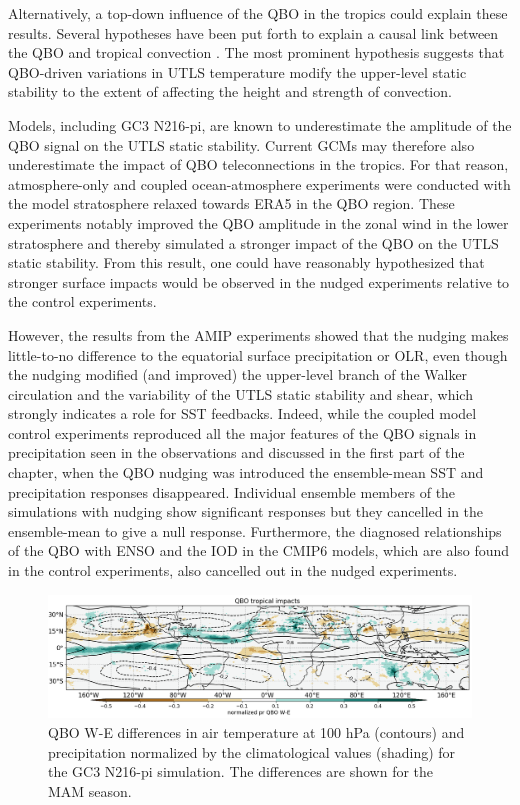 Alternatively, a top-down influence of the QBO in the tropics could explain these results. Several hypotheses have been put forth to explain a causal link between the QBO and tropical convection  \citep{hitchman2021observational,haynes2021influence}. The most prominent hypothesis suggests that QBO-driven variations in UTLS temperature modify the upper-level static stability to the extent of affecting the height and strength of convection.  


Models, including GC3 N216-pi, are known to underestimate the amplitude of the QBO signal on the UTLS static stability. Current GCMs may therefore 
also underestimate the impact of QBO teleconnections in the tropics. 
For that reason, atmosphere-only and coupled ocean-atmosphere experiments were 
conducted with the model stratosphere relaxed towards ERA5 in the QBO region. These 
experiments notably improved the QBO amplitude in the zonal wind in the lower stratosphere and thereby simulated a stronger impact of the QBO on the UTLS static stability. From this result, one could have reasonably hypothesized that stronger surface impacts would be observed in the nudged experiments relative to the control experiments. 

However, the results from the AMIP experiments showed that the nudging makes little-to-no difference to the equatorial surface precipitation or OLR, even though the nudging modified (and improved) the upper-level branch of the Walker circulation and the variability of the UTLS static stability and shear, which strongly indicates a role for SST feedbacks. Indeed, while the coupled model control experiments reproduced all the major features of the QBO signals in precipitation seen in the observations and discussed in the first part of the chapter, when the QBO nudging was introduced the ensemble-mean SST and precipitation responses disappeared. Individual ensemble members of the simulations with nudging show significant responses but they cancelled in the ensemble-mean to give a null response. Furthermore, the diagnosed relationships of the QBO with ENSO and the IOD in the CMIP6 models, which are also found in the control experiments, also cancelled out in the nudged experiments.  


\begin{figure}[t!]
\centering
 \noindent
 \includegraphics[width=\linewidth]{figures/finalfig.png}
\caption[Precipitation and 100 hPa temperature differences ]{QBO W-E differences in air temperature at 100 hPa (contours) and precipitation normalized by the climatological values (shading) for the GC3 N216-pi simulation. The differences are shown for the MAM season. }
\label{fig:qbo_mechanisms}
\end{figure}

